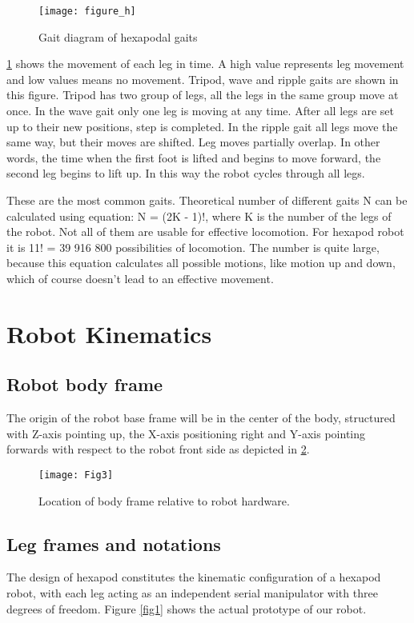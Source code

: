 \begin{figure}[h]
	\centering
	\texttt{[image: figure\_h]}
	\caption{Gait diagram of hexapodal gaits}
	\label{figure h.png}
\end{figure}

\ref{figure h.png} shows the movement of each leg in time. A high value represents leg movement and low values means no movement. Tripod, wave and ripple gaits are shown in this figure. Tripod has two group of legs, all the legs in the same group move at once. In the wave gait only one leg is moving at any time. After all legs are set up to their new positions, step is completed. In the ripple gait all legs move the same way, but their moves are shifted. Leg moves partially overlap. In other words, the time when the first foot is lifted and begins to move forward, the second leg begins to lift up. In this way the robot cycles through all legs.

These are the most common gaits. Theoretical number of different gaits N can be calculated using equation: N = (2K - 1)!, where K is the number of the legs of the robot. Not all of them are usable for effective locomotion. For hexapod robot it is 11! = 39 916 800 possibilities of locomotion. The number is quite large, because this equation calculates all possible motions, like motion up and down, which of course doesn’t lead to an effective movement.

\section{Robot Kinematics}

\subsection{Robot body frame}
The origin of the robot base frame will be in the center of the body, structured with Z-axis pointing up, the X-axis positioning right and Y-axis pointing forwards with respect to the robot front side as depicted in \ref{Loc}.

\begin{figure}[h]
	\centering
	\texttt{[image: Fig3]}
	\caption{ Location of body frame relative to robot hardware.}
	\label{Loc}
\end{figure}

\subsection{Leg frames and notations}
The design of hexapod constitutes the kinematic configuration of a hexapod robot, with each leg acting as an independent serial manipulator with three degrees of freedom. Figure \ref{fig1} shows the actual prototype of our robot.


